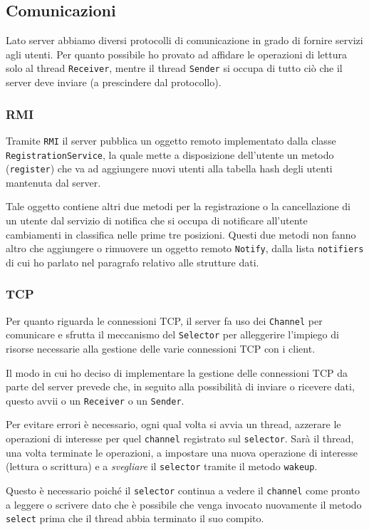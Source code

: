 \subsection{Comunicazioni}
Lato server abbiamo diversi protocolli di comunicazione in grado di fornire servizi agli utenti.
Per quanto possibile ho provato ad affidare le operazioni di lettura solo al thread \verb|Receiver|,
mentre il thread \verb|Sender| si occupa di tutto ciò che il server deve inviare (a prescindere
dal protocollo).

\subsubsection{RMI}
Tramite \verb|RMI| il server pubblica un oggetto remoto implementato dalla classe
\verb|RegistrationService|, la quale mette a disposizione dell'utente un metodo (\verb|register|)
che va ad aggiungere nuovi utenti alla tabella hash degli utenti mantenuta dal server.

Tale oggetto contiene altri due metodi per la registrazione o la cancellazione di un utente dal
servizio di notifica che si occupa di notificare all'utente cambiamenti in classifica nelle prime
tre posizioni. Questi due metodi non fanno altro che aggiungere o rimuovere un oggetto remoto
\verb|Notify|, dalla lista \verb|notifiers| di cui ho parlato nel paragrafo relativo alle strutture
dati.

\subsubsection{TCP}
Per quanto riguarda le connessioni TCP, il server fa uso dei \verb|Channel| per comunicare e
sfrutta il meccanismo del \verb|Selector| per alleggerire l'impiego di risorse necessarie alla
gestione delle varie connessioni TCP con i client.

Il modo in cui ho deciso di implementare la gestione delle connessioni TCP da parte del server
prevede che, in seguito alla possibilità di inviare o ricevere dati, questo avvii o un
\verb|Receiver| o un \verb|Sender|.

Per evitare errori è necessario, ogni qual volta si avvia un thread, azzerare le operazioni di
interesse per quel \verb|channel| registrato sul \verb|selector|. Sarà il thread, una volta
terminate le operazioni, a impostare una nuova operazione di interesse (lettura o scrittura) e a
\emph{svegliare} il \verb|selector| tramite il metodo \verb|wakeup|.

Questo è necessario poiché il \verb|selector| continua a vedere il \verb|channel| come pronto a
leggere o scrivere dato che è possibile che venga invocato nuovamente il metodo \verb|select|
prima che il thread abbia terminato il suo compito.

